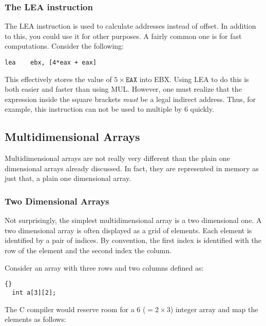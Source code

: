 
\subsubsection{The {\code LEA} instruction}

The {\code LEA} instruction is used to calculate addresses instead of 
{\code offset}. In addition to this, you could use it for other purposes. A fairly
common one is for fast computations. Consider the following:
\begin{lstlisting}[language={[x86masm]Assembler},numbers=none]
      lea    ebx, [4*eax + eax]
\end{lstlisting}
This effectively stores the value of $5 \times \mathtt{EAX}$ into EBX.
Using {\code LEA} to do this is both easier and faster than using
{\code MUL}. However, one must realize that the expression
inside the square brackets \emph{must} be a legal indirect address.
Thus, for example, this instruction can not be used to multiple by 6
quickly.


\subsection{Multidimensional Arrays}

Multidimensional arrays are not really very different than the plain
one dimensional arrays already discussed. In fact, they are represented 
in memory as just that, a plain one dimensional array.

\subsubsection{Two Dimensional Arrays}
Not surprisingly, the simplest multidimensional array is a two dimensional
one. A two dimensional array is often displayed as a grid of elements. Each
element is identified by a pair of indices. By convention, the first index
is identified with the row of the element and the second index the column.

Consider an array with three rows and two columns defined as: 
\begin{lstlisting}[stepnumber=0]{}
  int a[3][2];
\end{lstlisting}
The C compiler would reserve room for a 6 ($= 2 \times 3$) integer array and
map the elements as follows:

